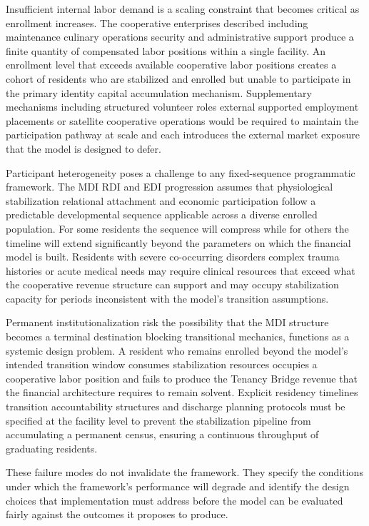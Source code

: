 \documentclass[12pt, letterpaper]{article}
\begin{document}
Insufficient internal labor demand is a scaling constraint that becomes critical as enrollment increases. The cooperative enterprises described including maintenance culinary operations security and administrative support produce a finite quantity of compensated labor positions within a single facility. An enrollment level that exceeds available cooperative labor positions creates a cohort of residents who are stabilized and enrolled but unable to participate in the primary identity capital accumulation mechanism. Supplementary mechanisms including structured volunteer roles external supported employment placements or satellite cooperative operations would be required to maintain the participation pathway at scale and each introduces the external market exposure that the model is designed to defer.

Participant heterogeneity poses a challenge to any fixed-sequence programmatic framework. The MDI RDI and EDI progression assumes that physiological stabilization relational attachment and economic participation follow a predictable developmental sequence applicable across a diverse enrolled population. For some residents the sequence will compress while for others the timeline will extend significantly beyond the parameters on which the financial model is built. Residents with severe co-occurring disorders complex trauma histories or acute medical needs may require clinical resources that exceed what the cooperative revenue structure can support and may occupy stabilization capacity for periods inconsistent with the model's transition assumptions.

Permanent institutionalization risk the possibility that the MDI structure becomes a terminal destination blocking transitional mechanics, functions as a systemic design problem. A resident who remains enrolled beyond the model's intended transition window consumes stabilization resources occupies a cooperative labor position and fails to produce the Tenancy Bridge revenue that the financial architecture requires to remain solvent. Explicit residency timelines transition accountability structures and discharge planning protocols must be specified at the facility level to prevent the stabilization pipeline from accumulating a permanent census, ensuring a continuous throughput of graduating residents.

These failure modes do not invalidate the framework. They specify the conditions under which the framework's performance will degrade and identify the design choices that implementation must address before the model can be evaluated fairly against the outcomes it proposes to produce.
\end{document}
